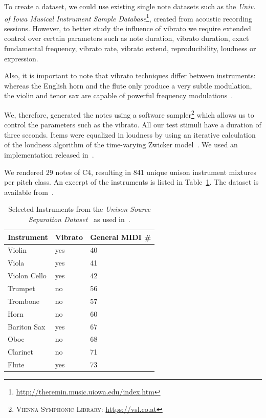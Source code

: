 \par
To create a dataset, we could use existing single note datasets such as the \emph{Univ. of Iowa Musical Instrument Sample Database}\footnote{\url{http://theremin.music.uiowa.edu/index.htm}}, created from acoustic recording sessions.
However, to better study the influence of vibrato we require extended control over certain parameters such as note duration, vibrato duration, exact fundamental frequency, vibrato rate, vibrato extend, reproducibility, loudness or expression.
\par
Also, it is important to note that vibrato techniques differ between instruments: whereas the English horn and the flute only produce a very subtle modulation, the violin and tenor sax are capable of powerful frequency modulations~\cite{gilbert05}.
\par
We, therefore, generated the notes using a software sampler\footnote{\textsc{Vienna Symphonic Library}: \url{https://vsl.co.at}} which allows us to control the parameters such as the vibrato.
All our test stimuli have a duration of three seconds.
Items were equalized in loudness by using an iterative calculation of the loudness algorithm of the time-varying Zwicker model~\cite{zwicker13}. 
We used an implementation released in~\cite{genesis12}. 
\par
We rendered 29 notes of C4, resulting in 841 unique unison instrument mixtures per pitch class.
An excerpt of the instruments is listed in Table~\ref{tab:testset}.
The dataset is available from~\cite{oss_unison}.

\begin{table}
\begin{center}
\footnotesize
\begin{tabular}{ l l l}
  Instrument & Vibrato &  General MIDI \# \\
  \hline
  Violin & yes & 40 \\
  Viola & yes & 41 \\
  Violon Cello & yes & 42 \\
  Trumpet & no & 56 \\
  Trombone & no & 57\\
  Horn & no & 60  \\
  Bariton Sax & yes & 67 \\
  Oboe & no & 68\\
  Clarinet & no & 71\\
  Flute & yes & 73\\
\end{tabular}
\end{center}
\caption{Selected Instruments from the \emph{Unison Source Separation Dataset}~\cite{oss_unison} as used in~\cite{stoeter14, stoeter16}.}
\label{tab:testset}
\end{table}

